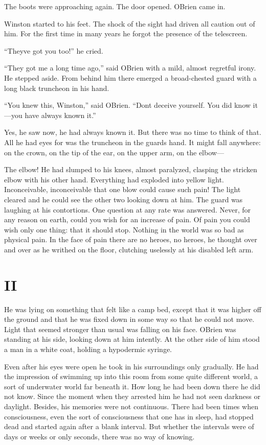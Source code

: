 The boots were approaching again. The door opened.
O\textquotesingle Brien came in.

Winston started to his feet. The shock of the sight had driven all
caution out of him. For the first time in many years he forgot the
presence of the telescreen.

``They\textquotesingle ve got you too!'' he cried.

``They got me a long time ago,'' said O\textquotesingle Brien with a mild,
almost regretful irony. He stepped aside. From behind him there emerged
a broad-chested guard with a long black truncheon in his hand.

``You knew this, Winston,'' said O\textquotesingle Brien.
``Don\textquotesingle t deceive yourself. You did know it---you have
always known it.''

Yes, he saw now, he had always known it. But there was no time to think
of that. All he had eyes for was the truncheon in the
guard\textquotesingle s hand. It might fall anywhere: on the crown, on
the tip of the ear, on the upper arm, on the elbow---

The elbow! He had slumped to his knees, almost paralyzed, clasping the
stricken elbow with his other hand. Everything had exploded into yellow
light. Inconceivable, inconceivable that one blow could cause such pain!
The light cleared and he could see the other two looking down at him.
The guard was laughing at his contortions. One question at any rate was
answered. Never, for any reason on earth, could you wish for an increase
of pain. Of pain you could wish only one thing: that it should stop.
Nothing in the world was so bad as physical pain. In the face of pain
there are no heroes, no heroes, he thought over and over as he writhed
on the floor, clutching uselessly at his disabled left arm.


\section{II}\label{ii-2}

He was lying on something that felt like a camp bed, except that it was
higher off the ground and that he was fixed down in some way so that he
could not move. Light that seemed stronger than usual was falling on his
face. O\textquotesingle Brien was standing at his side, looking down at
him intently. At the other side of him stood a man in a white coat,
holding a hypodermic syringe.

Even after his eyes were open he took in his surroundings only
gradually. He had the impression of swimming up into this room from some
quite different world, a sort of underwater world far beneath it. How
long he had been down there he did not know. Since the moment when they
arrested him he had not seen darkness or daylight. Besides, his memories
were not continuous. There had been times when consciousness, even the
sort of consciousness that one has in sleep, had stopped dead and
started again after a blank interval. But whether the intervals were of
days or weeks or only seconds, there was no way of knowing.

